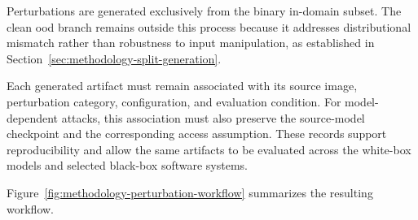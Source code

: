 Perturbations are generated exclusively from the binary in-domain subset. The
clean \gls{ood} branch remains outside this process because it addresses
distributional mismatch rather than robustness to input manipulation, as
established in Section~\ref{sec:methodology-split-generation}.

Each generated artifact must remain associated with its source image,
perturbation category, configuration, and evaluation condition. For
model-dependent attacks, this association must also preserve the source-model
checkpoint and the corresponding access assumption. These records support
reproducibility and allow the same artifacts to be evaluated across
the white-box models and selected black-box software systems.

Figure~\ref{fig:methodology-perturbation-workflow} summarizes the resulting
workflow.

